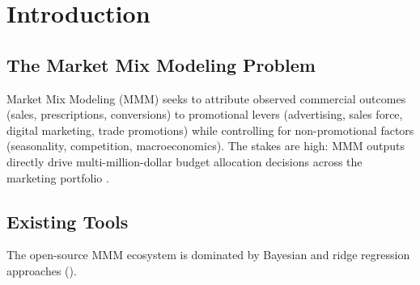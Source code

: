 \documentclass[review,12pt]{elsarticle}
\begin{document}
\section{Introduction}
\label{sec:intro}

\subsection{The Market Mix Modeling Problem}
\label{sec:intro:problem}

Market Mix Modeling (MMM) seeks to attribute observed commercial outcomes
(sales, prescriptions, conversions) to promotional levers (advertising, sales
force, digital marketing, trade promotions) while controlling for
non-promotional factors (seasonality, competition, macroeconomics). The stakes
are high: MMM outputs directly drive multi-million-dollar budget allocation
decisions across the marketing portfolio \cite{little1979aggregate}.

\subsection{Existing Tools}
\label{sec:intro:tools}

The open-source MMM ecosystem is dominated by Bayesian and ridge regression
approaches \cite{meridian2024google,pymcmarketing2023}
().

\begin{table}[ht]
\centering
\caption{Open-source MMM tools and their primary limitations.}
\label{tab:existing_tools}
\end{table}
\end{document}
